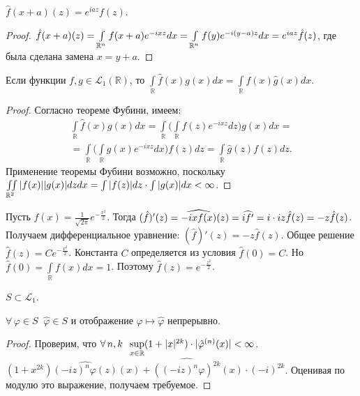 \documentclass[10pt]{article}
\newcommand*{\p}[1]{#1\nobreak\discretionary{}{\hbox{$\mathsurround=0pt #1$}}{}}
\begin{document}
\begin{theorem}
$\hat f(x+a)(z)=e^{iaz}f(z)$.
\end{theorem}

\begin{proof}
$\hat f(x+a)(z)=\int\limits_{\mathbb{R}^n}f(x+a)e^{-ixz}dx\p=
\int\limits_{\mathbb{R}^n}f(y)e^{-i(y-a)z}dx\p=e^{iaz}\hat f(z)$,
где была сделана замена $x=y+a$.
\end{proof}

\begin{theorem}
Если функции $f,g\in \mathcal{L}_1(\mathbb{R})$, то
$\int\limits_\mathbb{R}\hat
f(x)g(x)dx=\int\limits_\mathbb{R}f(x)\hat g(x)dx$.
\end{theorem}

\begin{proof}
Согласно теореме Фубини, имеем:
\begin{multline*}
\int\limits_\mathbb{R}\hat f(x)g(x)dx=
\int\limits_\mathbb{R}\Big(\int\limits_\mathbb{R}f(z)e^{-ixz}dz\Big)g(x)dx=\\=
\int\limits_\mathbb{R}\Big(\int\limits_\mathbb{R}g(x)e^{-ixz}dx\Big)f(z)dz=
\int\limits_\mathbb{R}\hat g(z)f(z)dz.
\end{multline*}
Применение теоремы Фубини возможно, поскольку
$\iint\limits_{\mathbb{R}^2}|f(x)||g(x)|dzdx\p=\int
|f(z)|dz\cdot\int |g(x)|dx <\infty$.
\end{proof}

\begin{ex}
  Пусть $f(x)=\frac{1}{\sqrt{2\pi}}e^{-\frac{x^2}{2}}$. Тогда $(\hat
  f)'(z)=\widehat {-ixf(x)}(z)=\widehat {if'}=i\cdot iz\hat
  f(z)\p=-z\hat f(z)$. Получаем дифференциальное уравнение: $(\hat
  f)'(z)=-z\hat f(z)$. Общее решение $\hat f(z)=Ce^{-\frac{x^2}{2}}$.
  Константа $C$ определяется из условия $\hat f(0)=C$. Но $\hat
  f(0)=\int\limits_{\mathbb{R}}f(x)dx=1$. Поэтому $\hat
  f(z)=e^{-\frac{z^2}{2}}$.
\end{ex}

\begin{note}
$S\subset \mathcal{L}_1$.
\end{note}

\begin{theorem}
$\forall\,\varphi\in S\;\; \hat \varphi\in S$ и отображение $\varphi
\mapsto \hat \varphi$ непрерывно.
\end{theorem}

\begin{proof}
Проверим, что $\forall\, n,k\;\; \sup\limits_{x\in\mathbb{R}}
(1\p+|x|^{2k})\cdot |\hat {\varphi}^{(n)}(x)|<\infty$.
$(1+x^{2k})\widehat {(-iz)^n\varphi(z)}(x)+\widehat
{((-iz)^n\varphi)^{2k}}(x)\cdot (-i)^{2k}$. Оценивая по модулю это
выражение, получаем требуемое.%
\end{proof}
\end{document}
